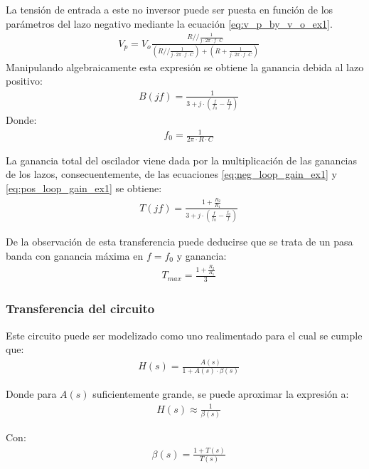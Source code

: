La tensión de entrada a este no inversor puede ser puesta en función de los parámetros del lazo negativo mediante la ecuación \ref{eq:v_p_by_v_o_ex1}.
\begin{align*}
    & V_p = V_o \frac{R // \frac{1}{j \cdot 2\pi \cdot f \cdot C}}{\left( R // \frac{1}{j \cdot 2\pi \cdot f \cdot C} \right) + \left( R + \frac{1}{j \cdot 2\pi \cdot f \cdot C}\right)}
    \label{eq:v_p_by_v_o_ex1}
\end{align*}
Manipulando algebraicamente esta expresión se obtiene la ganancia debida al lazo positivo:
\begin{align}
    & B(jf) = \frac{1}{3 + j \cdot \left(\frac{f}{f_0} - \frac{f_0}{f}\right)}
    \label{eq:pos_loop_gain_ex1}
\end{align}
Donde:
\begin{align}
    & f_0 = \frac{1}{2\pi \cdot R \cdot C}
    \label{eq:osc_freq_ex1}
\end{align}

La ganancia total del oscilador viene dada por la multiplicación de las ganancias de los lazos, consecuentemente, de las ecuaciones \ref{eq:neg_loop_gain_ex1} y \ref{eq:pos_loop_gain_ex1}
se obtiene:
\begin{align}
    & T(jf) = \frac{1 + \frac{R_2}{R_1}}{3 + j \cdot \left(\frac{f}{f_0} - \frac{f_0}{f}\right)}
    \label{eq:total_gain_ex1}
\end{align}

De la observación de esta transferencia puede deducirse que se trata de un pasa banda con ganancia máxima en $f = f_0$ y ganancia:
\begin{align}
    & T_{max} = \frac{1 + \frac{R_2}{R_1}}{3}
    \label{eq:max_gain_ex1}
\end{align}


\subsubsection{Transferencia del circuito}
Este circuito puede ser modelizado como uno realimentado para el cual se cumple que:
\begin{align*}
    & H(s) = \frac{A(s)}{1 + A(s) \cdot \beta(s)}
\end{align*}

Donde para $A(s)$ suficientemente grande, se puede aproximar la expresión a:
\begin{align*}
    & H(s) \approx \frac{1}{\beta(s)}
\end{align*}

Con:
\begin{align*}
    & \beta(s) = \frac{1 + T(s)}{T(s)}
\end{align*}

